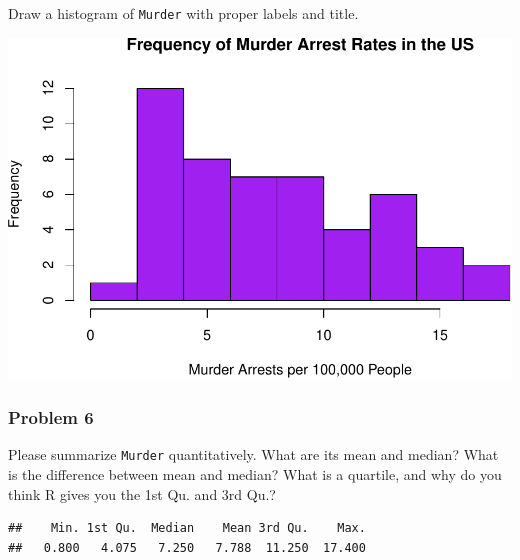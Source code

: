 \documentclass[
]{article}
\newenvironment{Shaded}{\begin{snugshade}}{\end{snugshade}}
\newcommand{\AttributeTok}[1]{\textcolor[rgb]{0.77,0.63,0.00}{#1}}
\newcommand{\FunctionTok}[1]{\textcolor[rgb]{0.00,0.00,0.00}{#1}}
\newcommand{\NormalTok}[1]{#1}
\newcommand{\SpecialCharTok}[1]{\textcolor[rgb]{0.00,0.00,0.00}{#1}}
\newcommand{\StringTok}[1]{\textcolor[rgb]{0.31,0.60,0.02}{#1}}
\begin{document}
Draw a histogram of \texttt{Murder} with proper labels and title.

\begin{Shaded}
\end{Shaded}

\includegraphics{Assignments_files/figure-latex/unnamed-chunk-7-1.pdf}

\hypertarget{problem-6}{%
\subsubsection{Problem 6}\label{problem-6}}

Please summarize \texttt{Murder} quantitatively. What are its mean and
median? What is the difference between mean and median? What is a
quartile, and why do you think R gives you the 1st Qu. and 3rd Qu.?

\begin{Shaded}
\end{Shaded}

\begin{verbatim}
##    Min. 1st Qu.  Median    Mean 3rd Qu.    Max. 
##   0.800   4.075   7.250   7.788  11.250  17.400
\end{verbatim}
\end{document}
